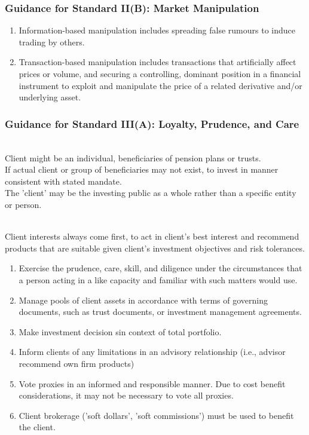 \subsubsection{Guidance for Standard II(B): Market Manipulation}

\begin{remark} 
\begin{enumerate}[label=\roman*.]
\setlength{\itemsep}{0pt}
\item Information-based manipulation includes spreading false rumours to induce trading by others.
\item Transaction-based manipulation includes transactions that artificially affect prices or volume, and securing a controlling, dominant position in a financial instrument to exploit and manipulate the price of a related derivative and/or underlying asset.
\end{enumerate}
\end{remark}

\subsubsection{Guidance for Standard III(A): Loyalty, Prudence, and Care}

\begin{remark} \\
Client might be an individual, beneficiaries of pension plans or trusts.\\
If actual client or group of beneficiaries may not exist, to invest in manner consistent with stated mandate.\\
The 'client' may be the investing public as a whole rather than a specific entity or person.
\end{remark}

\begin{remark} \\
Client interests always come first, to act in client's best interest and recommend products that are suitable given client's investment objectives and risk tolerances.
\begin{enumerate}[label=\roman*.]
\setlength{\itemsep}{0pt}
\item Exercise the prudence, care, skill, and diligence under the circumstances that a person acting in a like capacity and familiar with such matters would use.
\item Manage pools of client assets in accordance with terms of governing documents, such as trust documents, or investment management agreements.
\item Make investment decision sin context of total portfolio.
\item Inform clients of any limitations in an advisory relationship (i.e., advisor recommend own firm products)
\item Vote proxies in an informed and responsible manner. Due to cost benefit considerations, it may not be necessary to vote all proxies.
\item Client brokerage ('soft dollars', 'soft commissions') must be used to benefit the client.
\end{enumerate}
\end{remark}

